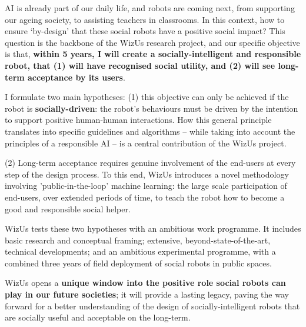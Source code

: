 \documentclass[11pt,a4paper]{report}
\newcommand{\project}{WizUs\xspace}
\begin{document}
AI is already part of our daily life, and robots are coming next, from
supporting our ageing society, to assisting teachers in classrooms. In this
context, how to ensure `by-design' that these social robots have a positive
social impact? This question is the backbone of the \project research project,
and our specific objective is that, \textbf{within 5 years, I will create a
socially-intelligent and responsible robot, that (1) will have recognised social
utility, and (2) will see long-term acceptance by its users}.

I formulate two main hypotheses: (1) this objective can only be achieved if the
robot is \textbf{socially-driven}: the robot's behaviours must be driven by the
intention to support positive human-human interactions. How this general
principle translates into specific guidelines and algorithms -- while taking into
account the principles of a responsible AI -- is a central
contribution of the \project project.

(2) Long-term acceptance requires genuine involvement of the end-users at every
step of the design process. To this end, \project introduces a novel methodology
involving 'public-in-the-loop' machine learning: the large scale participation
of end-users, over extended periods of time, to teach the robot how to become a
good and responsible social helper.

\project tests these two hypotheses with an ambitious work programme. It
includes basic research and conceptual framing; extensive, beyond-state-of-the-art, technical
developments; and an ambitious experimental programme, with a combined three years
of field deployment of social robots in public spaces.

\project opens a \textbf{unique window into the positive role social robots can
play in our future societies}; it will provide a lasting legacy, paving the way
forward for a better understanding of the design of socially-intelligent robots
that are socially useful and acceptable on the long-term.

\newpage


\pagebreak


\newcommand{\wpOne}{Framing robot-supported human-human interaction}
\newcommand{\wpOneShort}{Framing r-HHI}
\end{document}
